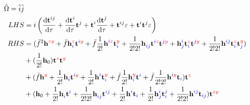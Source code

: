 \documentclass{article}
\newcommand{\bh}{\textbf{h}}
\newcommand{\bt}{\textbf{t}}
\newcommand{\down}[1]{\hat{#1}}
\begin{document}
\begin{align}\begin{split}
    \hat{\Omega} = \down{i}\down{j}
\\ LHS &=
    i\left(\dv{\bt^{ij}_{}}{\tau} + \dv{\bt^{i}_{}}{\tau}\bt^{j}_{} + \bt^{i}_{}\dv{\bt^{j}_{}}{\tau} + \bt^{ij}_{}\varepsilon + \bt^{i}_{}\bt^{j}_{}\varepsilon\right)
\\ RHS &=
%
%
(\bar{f}^{2}\bh^{\blue{}\red{zy}}_{\blue{}\red{}} + \bar{f}\bh^{\blue{}\red{z}}_{\blue{i}\red{}}\bt^{\blue{i}\red{y}} + \bar{f}\frac{1}{2!}\bh^{\blue{i}\red{z}}_{\blue{}\red{}}\bt^{\blue{}\red{y}}_{\blue{i}\red{}} + \frac{1}{2!2!}\bh^{\blue{}\red{}}_{\blue{ij}\red{}}\bt^{\blue{i}\red{z}}\bt^{\blue{j}\red{y}} + \bh^{\blue{i}\red{}}_{\blue{j}\red{}}\bt^{\blue{}\red{z}}_{\blue{i}\red{}}\bt^{\blue{j}\red{y}} + \frac{1}{2!2!}\bh^{\blue{ij}\red{}}_{\blue{}\red{}}\bt^{\blue{}\red{z}}_{\blue{i}\red{}}\bt^{\blue{}\red{y}}_{\blue{j}\red{}})
%
%
\\  &+
%
%
(\frac{1}{2!}\bh_0)\bt^{\blue{}\red{z}}\bt^{\blue{}\red{y}}
    \\  &+  %
(\bar{f}\bh^{\blue{}\red{y}}_{\blue{}\red{}} + \frac{1}{2!}\bh^{\blue{}\red{}}_{\blue{i}\red{}}\bt^{\blue{i}\red{y}} + \frac{1}{2!}\bh^{\blue{i}\red{}}_{\blue{}\red{}}\bt^{\blue{}\red{y}}_{\blue{i}\red{}} + \bar{f}\frac{1}{2!}\bh^{\blue{}\red{y}}_{\blue{i}\red{}}\bt^{\blue{i}\red{}} + \bar{f}\frac{1}{2!2!}\bh^{\blue{i}\red{y}}_{\blue{}\red{}}\bt_{\blue{i}\red{}})\bt^{\blue{}\red{z}}
%
%
\\  &+
%
%
(\bh_0 + \frac{1}{2!}\bh^{\blue{}\red{}}_{\blue{i}\red{}}\bt^{\blue{i}\red{}} + \frac{1}{2!2!}\bh^{\blue{}\red{}}_{\blue{ij}\red{}}\bt^{\blue{ij}\red{}} + \frac{1}{2!}\bh^{\blue{i}\red{}}_{\blue{}\red{}}\bt_{\blue{i}\red{}} + \frac{1}{2!}\bh^{\blue{i}\red{}}_{\blue{j}\red{}}\bt^{\blue{j}\red{}}_{\blue{i}\red{}} + \frac{1}{2!2!}\bh^{\blue{ij}\red{}}_{\blue{}\red{}}\bt_{\blue{ij}\red{}})\bt^{\blue{}\red{zy}}
\end{split}\end{align}

%
%
%
%
%
\end{document}
